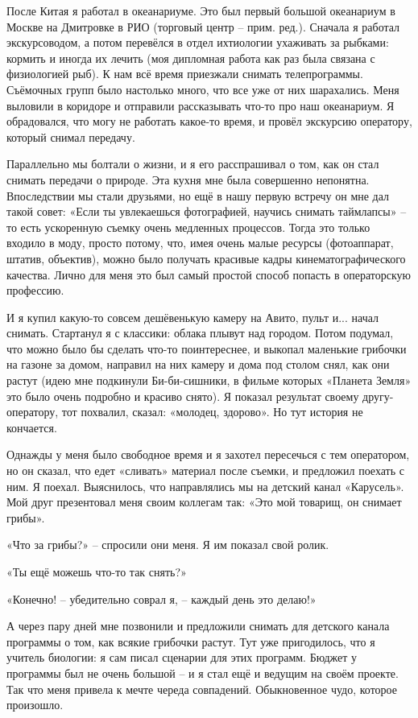 После Китая я работал в океанариуме. Это был первый большой океанариум в
Москве на Дмитровке в РИО (торговый центр – прим. ред.). Сначала я работал
экскурсоводом, а потом перевёлся в отдел ихтиологии ухаживать за рыбками:
кормить и иногда их лечить (моя дипломная работа как раз была связана с
физиологией рыб). К нам всё время приезжали снимать телепрограммы. Съёмочных
групп было настолько много, что все уже от них шарахались. Меня выловили в
коридоре и отправили рассказывать что-то про наш океанариум. Я обрадовался,
что могу не работать какое-то время, и провёл экскурсию оператору, который
снимал передачу.

Параллельно мы болтали о жизни, и я его расспрашивал о том, как он стал снимать
передачи о природе. Эта кухня мне была совершенно непонятна. Впоследствии мы
стали друзьями, но ещё в нашу первую встречу он мне дал такой совет: «Если ты
увлекаешься фотографией, научись снимать таймлапсы» – то есть ускоренную съемку
очень медленных процессов. Тогда это только входило в моду, просто потому, что,
имея очень малые ресурсы (фотоаппарат, штатив, объектив), можно было получать
красивые кадры кинематографического качества. Лично для меня это был самый
простой способ попасть в операторскую профессию.

И я купил какую-то совсем дешёвенькую камеру на Авито, пульт и... начал
снимать. Стартанул я с классики: облака плывут над городом. Потом подумал, что
можно было бы сделать что-то поинтереснее, и выкопал маленькие грибочки на
газоне за домом, направил на них камеру и дома под столом снял, как они растут
(идею мне подкинули Би-би-сишники, в фильме которых «Планета Земля» это было
очень подробно и красиво снято). Я показал результат своему другу-оператору,
тот похвалил, сказал: «молодец, здорово». Но тут история не кончается.

Однажды у меня было свободное время и я захотел пересечься с тем оператором, но
он сказал, что едет «сливать» материал после съемки, и предложил поехать с ним.
Я поехал. Выяснилось, что направлялись мы на детский канал «Карусель». Мой друг
презентовал меня своим коллегам так: «Это мой товарищ, он снимает грибы».

«Что за грибы?» – спросили они меня. Я им показал свой ролик.

«Ты ещё можешь что-то так снять?»

«Конечно! – убедительно соврал я, – каждый день это делаю!»

А через пару дней мне позвонили и предложили снимать для детского канала
программы о том, как всякие грибочки растут. Тут уже пригодилось, что я учитель
биологии: я сам писал сценарии для этих программ. Бюджет у программы был не
очень большой – и я стал ещё и ведущим на своём проекте. Так что меня привела к
мечте череда совпадений. Обыкновенное чудо, которое произошло. 

